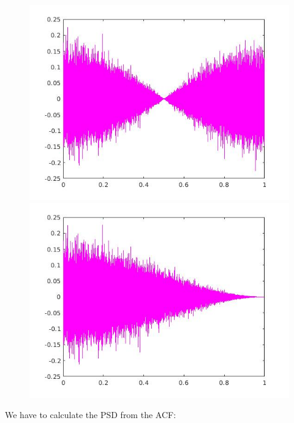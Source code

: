 \documentclass[a4paper,11pt]{article}
\begin{document}
\begin{figure}[!hp]
\centering
\begin{minipage}{.5\textwidth}
  \centering
  \includegraphics[width=1\linewidth]{images/lab4_13.jpg}
\end{minipage}%
\begin{minipage}{.5\textwidth}
  \centering
  \includegraphics[width=1\linewidth]{images/lab4_16.jpg}
\end{minipage}
\end{figure}

\newpage

We have to calculate the PSD from the ACF:
\end{document}
